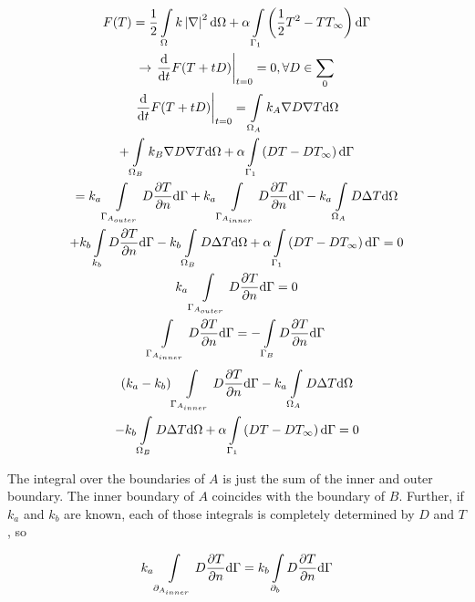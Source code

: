 \begin{gather*}
F(T) = \frac{1}{2}\int\displaylimits_{\Omega}k\left|\nabla\right|^2\mathrm{d}\Omega + \alpha \int\displaylimits_{\Gamma_1}\left(\frac{1}{2}T^2-TT_{\infty}\right)\mathrm{d}\Gamma\\
\rightarrow \left.\frac{\mathrm{d}}{\mathrm{d}t}F(T+tD)\right|_{t=0} = 0, \forall D \in \sum_0\\
\left.\frac{\mathrm{d}}{\mathrm{d}t}F(T+tD)\right|_{t=0} =  \int\displaylimits_{\Omega_A}k_A\nabla D \nabla T \mathrm{d}\Omega\\ + \int\displaylimits_{\Omega_B}k_B\nabla D \nabla T \mathrm{d}\Omega + \alpha \int\displaylimits_{\Gamma_1}\left(DT-DT_{\infty}\right)\mathrm{d}\Gamma\\
= k_a\int\displaylimits_{\Gamma_{A_{outer}}}D\frac{\partial T}{\partial n}\mathrm{d}\Gamma + k_a\int\displaylimits_{\Gamma_{A_{inner}}}D\frac{\partial T}{\partial n}\mathrm{d}\Gamma - k_a\int\displaylimits_{\Omega_A}D\Delta T \mathrm{d}\Omega \\
+ k_b \int\displaylimits_{k_b}D\frac{\partial T}{\partial n}\mathrm{d}\Gamma - k_b\int\displaylimits_{\Omega_B}D\Delta T \mathrm{d}\Omega + \alpha \int\displaylimits_{\Gamma_1}\left(DT-DT_{\infty}\right)\mathrm{d}\Gamma = 0\\
k_a\int\displaylimits_{\Gamma_{A_{outer}}}D\frac{\partial T}{\partial n}\mathrm{d}\Gamma = 0\\
\int\displaylimits_{\Gamma_{A_{inner}}}D\frac{\partial T}{\partial n}\mathrm{d}\Gamma = -\int\displaylimits_{\Gamma_{B}}D\frac{\partial T}{\partial n}\mathrm{d}\Gamma
\end{gather*}
\begin{gather*}
\left(k_a-k_b\right)\int\displaylimits_{\Gamma_{A_{inner}}}D\frac{\partial T}{\partial n}\mathrm{d}\Gamma - k_a\int\displaylimits_{\Omega_A}D\Delta T \mathrm{d}\Omega\\ - k_b\int\displaylimits_{\Omega_B}D\Delta T \mathrm{d}\Omega + \alpha \int\displaylimits_{\Gamma_1}\left(DT-DT_{\infty}\right)\mathrm{d}\Gamma = 0\\
\end{gather*}


The integral over the boundaries of $A$ is just the sum of the inner and outer boundary. The inner boundary of $A$ coincides with the boundary of $B$. Further, if $k_a$ and $k_b$ are known, each of those integrals is completely determined by $D$ and $T$, so 

\begin{gather*}
k_a\int\displaylimits_{\partial_{A_{inner}}}D\frac{\partial T}{\partial n} \mathrm{d}\Gamma = k_b\int\displaylimits_{\partial_{b}}D\frac{\partial T}{\partial n} \mathrm{d}\Gamma
\end{gather*}

